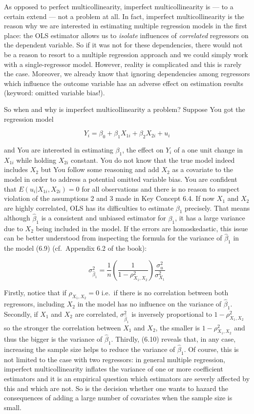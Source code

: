 \documentclass[]{book}
\theoremstyle{definition}
\theoremstyle{definition}
\theoremstyle{definition}
\theoremstyle{remark}
\begin{document}
As opposed to perfect multicollinearity, imperfect multicollinearity is
--- to a certain extend --- not a problem at all. In fact, imperfect
multicollinearity is the reason why we are interested in estimating
multiple regression models in the first place: the OLS estimator allows
us to \emph{isolate} influences of \emph{correlated} regressors on the
dependent variable. So if it was not for these dependencies, there would
not be a reason to resort to a multiple regression approach and we could
simply work with a single-regressor model. However, reality is
complicated and this is rarely the case. Moreover, we already know that
ignoring dependencies among regressors which influence the outcome
variable has an adverse effect on estimation results (keyword: omitted
variable bias!).

So when and why is imperfect multicollinearity a problem? Suppose You
got the regression model

\[ Y_i = \beta_0 + \beta_1 X_{1i} + \beta_2 X_{2i} + u_i \tag{6.9} \]

and You are interested in estimating \(\beta_1\), the effect on \(Y_i\)
of a one unit change in \(X_{1i}\) while holding \(X_{2i}\) constant.
You do not know that the true model indeed includes \(X_2\) but You
follow some reasoning and add \(X_2\) as a covariate to the model in
order to address a potential omitted variable bias. You are confident
that \(E(u_i\vert X_{1i}, X_{2i})=0\) for all observations and there is
no reason to suspect violation of the assumptions 2 and 3 made in Key
Concept 6.4. If now \(X_1\) and \(X_2\) are highly correlated, OLS has
its difficulties to estimate \(\beta_1\) precisely. That means although
\(\hat\beta_1\) is a consistent and unbiased estimator for \(\beta_1\),
it has a large variance due to \(X_2\) being included in the model. If
the errors are homoskedastic, this issue can be better understood from
inspecting the formula for the variance of \(\hat\beta_1\) in the model
(6.9) (cf.~Appendix 6.2 of the book):

\[ \sigma^2_{\hat\beta_1} = \frac{1}{n} \left( \frac{1}{1-\rho^2_{X_1,X_2}} \right) \frac{\sigma^2_u}{\sigma^2_{X_1}} \tag{6.10} \]

Firstly, notice that if \(\rho_{X_1,X_2}=0\) i.e.~if there is no
correlation between both regressors, including \(X_2\) in the model has
no influence on the variance of \(\hat\beta_1\). Secondly, if \(X_1\)
and \(X_2\) are correlated, \(\sigma^2_{\hat\beta_1}\) is inversely
proportional to \(1-\rho^2_{X_1,X_2}\) so the stronger the correlation
between \(X_1\) and \(X_2\), the smaller is \(1-\rho^2_{X_1,X_2}\) and
thus the bigger is the variance of \(\hat\beta_1\). Thirdly, (6.10)
reveals that, in any case, increasing the sample size helps to reduce
the variance of \(\hat\beta_1\). Of course, this is not limited to the
case with two regressors: in general multiple regression, imperfect
multicollinearity inflates the variance of one or more coefficient
estimators and it is an empirical question which estimators are severly
affected by this and which are not. So is the decision whether one wants
to hazard the consequences of adding a large number of covariates when
the sample size is small.
\end{document}
